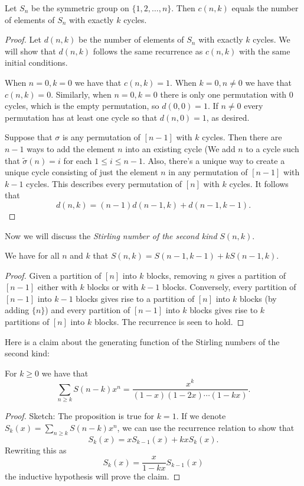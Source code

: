 \begin{theorem}
Let $S_n$ be the symmetric group on $\{1, 2, \dots, n\}$. Then $c(n, k)$ equals the number of elements of $S_n$ with exactly $k$ cycles.
\end{theorem}
\begin{proof}
Let $d(n,k)$ be the number of elements of $S_n$ with exactly $k$ cycles. We will show that $d(n, k)$ follows the same recurrence as $c(n, k)$ with the same initial conditions. 

When $n = 0, k = 0$ we have that $c(n, k) = 1$. When $k = 0, n \neq 0$ we have that $c(n, k) = 0$. Similarly, when $n = 0, k = 0$ there is only one permutation with $0$ cycles, which is the empty permutation, so $d(0, 0) = 1$. If $n \neq 0$ every permutation has at least one cycle so that $d(n, 0) = 1$, as desired.

Suppose that $\sigma$ is any permutation of $[n-1]$ with $k$ cycles. Then there are $n-1$ ways to add the element $n$ into an existing cycle (We add $n$ to a cycle such that $\tilde{\sigma}(n) = i$ for each $1 \leq i \leq n-1$. Also, there's a unique way to create a unique cycle consisting of just the element $n$ in any permutation of $[n-1]$ with $k-1$ cycles. This describes every permutation of $[n]$ with $k$ cycles. It follows that 
\[d(n,k) = (n-1)d(n-1, k) + d(n-1, k-1).\]
\end{proof}

Now we will discuss the \textit{Stirling number of the second kind} $S(n, k)$.
\begin{proposition}
We have for all $n$ and $k$ that $S(n, k) = S(n-1, k-1) + kS(n-1, k)$.
\end{proposition}
\begin{proof}
Given a partition of $[n]$ into $k$ blocks, removing $n$ gives a partition of $[n-1]$ either with $k$ blocks or with $k-1$ blocks. Conversely, every partition of $[n-1]$ into $k-1$ blocks gives rise to a partition of $[n]$ into $k$ blocks (by adding $\{n\}$) and every partition of $[n-1]$ into $k$ blocks gives rise to $k$ partitions of $[n]$ into $k$ blocks. The recurrence is seen to hold.
\end{proof}

Here is a claim about the generating function of the Stirling numbers of the second kind:

\begin{proposition}
For $k \geq 0$ we have that
\[\sum_{n \geq k}S(n-k)x^n = \frac{x^k}{(1-x)(1-2x)\cdots(1-kx)}.\]
\end{proposition}
\begin{proof}
Sketch: The proposition is true for $k = 1$.
If we denote $S_k(x) = \sum_{n \geq k}S(n-k)x^n$, we can use the recurrence relation to show that 
\[S_k(x) = xS_{k-1}(x) + kxS_k(x).\] Rewriting this as
\[S_k(x) = \frac{x}{1-kx}S_{k-1}(x)\] the inductive hypothesis will prove the claim.
\end{proof}

